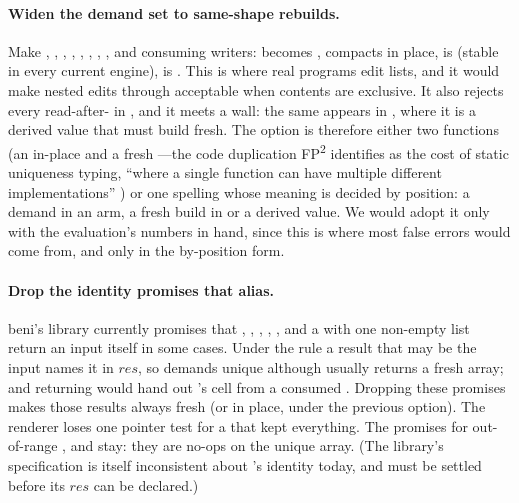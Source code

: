 \paragraph{Widen the demand set to same-shape rebuilds.} Make , ,
, , , , , , 
and  consuming writers:  becomes ,  compacts in
place,  is  (stable in every current engine),  is
. This is where real programs edit lists, and it would make nested edits through
 acceptable when contents are exclusive. It also rejects every read-after- in
, and it meets a wall: the same  appears in ,
where it is a derived value that must build fresh. The option is therefore either two functions (an
in-place and a fresh ---the code duplication FP\textsuperscript{2} identifies as the cost of
static uniqueness typing, ``where a single function can have multiple different implementations''
\citep[\S1.4.1]{lorenzen2023fp2}) or one spelling whose meaning is decided by position: a demand in an
 arm, a fresh build in  or a derived value. We would adopt it only with the
evaluation's numbers in hand, since this is where most false errors would come from, and only in the
by-position form.

\paragraph{Drop the identity promises that alias.} beni's library currently promises that
, , , , ,  and a 
with one non-empty list return an input itself in some cases. Under the rule a result that may be the
input names it in $\mathit{res}$, so  demands  unique
although  usually returns a fresh array; and  returning  would hand
out 's cell from a consumed . Dropping these promises makes those results always
fresh (or in place, under the previous option). The renderer loses one pointer test for a
 that kept everything. The promises for out-of-range ,  and
 stay: they are no-ops on the unique array. (The library's specification is itself
inconsistent about 's identity today, and must be settled before its $\mathit{res}$ can be
declared.)

